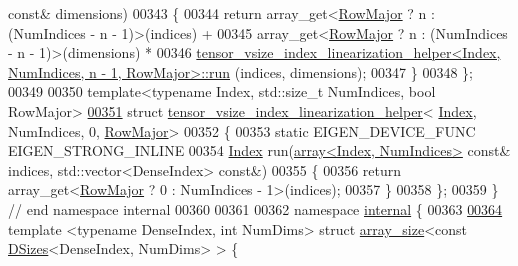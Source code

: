 \begin{DoxyCode}
{      const}& dimensions)
00343   \{
00344     \textcolor{keywordflow}{return} array\_get<\hyperlink{group__enums_ggaacded1a18ae58b0f554751f6cdf9eb13acfcde9cd8677c5f7caf6bd603666aae3}{RowMajor} ? n : (NumIndices - n - 1)>(indices) +
00345       array\_get<\hyperlink{group__enums_ggaacded1a18ae58b0f554751f6cdf9eb13acfcde9cd8677c5f7caf6bd603666aae3}{RowMajor} ? n : (NumIndices - n - 1)>(dimensions) *
00346         
      \hyperlink{struct_eigen_1_1internal_1_1tensor__vsize__index__linearization__helper}{tensor\_vsize\_index\_linearization\_helper<Index, NumIndices, n - 1, RowMajor>::run}
      (indices, dimensions);
00347   \}
00348 \};
00349 
00350 \textcolor{keyword}{template}<\textcolor{keyword}{typename} Index, std::\textcolor{keywordtype}{size\_t} NumIndices, \textcolor{keywordtype}{bool} RowMajor>
\hyperlink{struct_eigen_1_1internal_1_1tensor__vsize__index__linearization__helper_3_01_index_00_01_num_ind9177d0103e87c6e554ba6030344a88bc}{00351} \textcolor{keyword}{struct }\hyperlink{struct_eigen_1_1internal_1_1tensor__vsize__index__linearization__helper}{tensor\_vsize\_index\_linearization\_helper}<
      \hyperlink{namespace_eigen_a62e77e0933482dafde8fe197d9a2cfde}{Index}, NumIndices, 0, \hyperlink{group__enums_ggaacded1a18ae58b0f554751f6cdf9eb13acfcde9cd8677c5f7caf6bd603666aae3}{RowMajor}>
00352 \{
00353   \textcolor{keyword}{static} EIGEN\_DEVICE\_FUNC EIGEN\_STRONG\_INLINE
00354   \hyperlink{namespace_eigen_a62e77e0933482dafde8fe197d9a2cfde}{Index} run(\hyperlink{class_eigen_1_1array}{array<Index, NumIndices>} \textcolor{keyword}{const}& indices, std::vector<DenseIndex> \textcolor{keyword}{
      const}&)
00355   \{
00356     \textcolor{keywordflow}{return} array\_get<\hyperlink{group__enums_ggaacded1a18ae58b0f554751f6cdf9eb13acfcde9cd8677c5f7caf6bd603666aae3}{RowMajor} ? 0 : NumIndices - 1>(indices);
00357   \}
00358 \};
00359 \}  \textcolor{comment}{// end namespace internal}
00360 
00361 
00362 \textcolor{keyword}{namespace }\hyperlink{namespaceinternal}{internal} \{
00363 
\hyperlink{struct_eigen_1_1internal_1_1array__size_3_01const_01_d_sizes_3_01_dense_index_00_01_num_dims_01_4_01_4}{00364} \textcolor{keyword}{template} <\textcolor{keyword}{typename} DenseIndex, \textcolor{keywordtype}{int} NumDims> \textcolor{keyword}{struct }\hyperlink{struct_eigen_1_1internal_1_1array__size}{array\_size}<const 
      \hyperlink{struct_eigen_1_1_d_sizes}{DSizes}<DenseIndex, NumDims> > \{

\end{DoxyCode}
